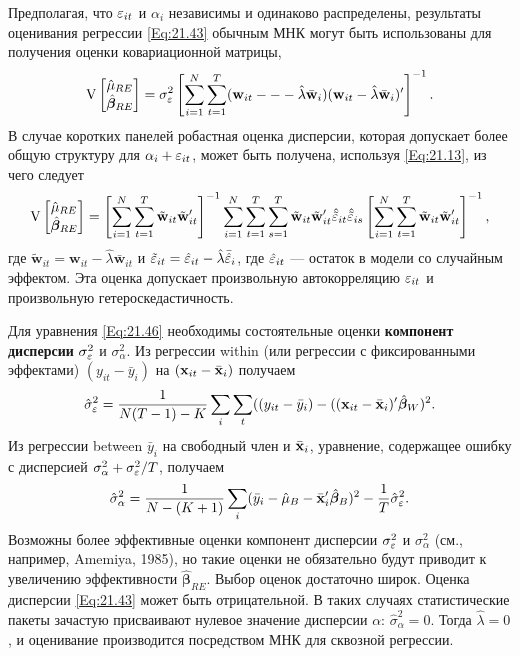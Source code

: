 Предполагая, что $\varepsilon_{it}$ и $\alpha_i$ независимы и одинаково распределены, результаты оценивания регрессии \ref{Eq:21.43} обычным МНК могут быть использованы для получения оценки ковариационной матрицы,
 \begin{align}
\mathrm V
\begin{bmatrix}
 \hat{\mu}_{RE} \\ \hat{\bm\beta}_{RE}
\end{bmatrix}
=
\sigma^2_\varepsilon
\left[ \sum^N_{i=1} \sum^T_{t=1} (\mathbf w_{it} --- \hat{\lambda} \bar{\mathbf w}_i)
 (\mathbf w_{it} -\hat{\lambda} \bar{\mathbf w}_i)' \right]^{-1}.
\label{Eq:21.46}
\end{align}
В случае коротких панелей робастная оценка дисперсии, которая допускает более общую структуру для $\alpha_i+\varepsilon_{it}$, может быть получена, используя \ref{Eq:21.13}, из чего следует
 \begin{align}
\mathrm V
\begin{bmatrix}
 \hat{\mu}_{RE} \\ \hat{\bm\beta}_{RE}
\end{bmatrix}
=
\left[ \sum^N_{i=1} \sum^T_{t=1} \tilde{\mathbf w}_{it} \tilde{\mathbf w}_{it}' \right]^{-1}
\sum^N_{i=1} \sum^T_{t=1} \sum^T_{s=1} \tilde{\mathbf w}_{it} \tilde{\mathbf w}_{it}' \hat{\tilde{\varepsilon}}_{it} \hat{\tilde{\varepsilon}}_{is}
\left[ \sum^N_{i=1} \sum^T_{t=1} \tilde{\mathbf w}_{it} \tilde{\mathbf w}_{it}' \right]^{-1},
\label{Eq:21.47}
\end{align}
где $\tilde{\mathbf w}_{it}=\mathbf w_{it} -\hat{\lambda} \bar{\mathbf w}_{it}$ и $\tilde{\varepsilon}_{it}=\hat{\varepsilon}_{it}-\hat{\lambda}\bar{\hat{\varepsilon}}_i$, где $\hat{\varepsilon}_{it}$ --- остаток в модели со случайным эффектом. Эта оценка допускает произвольную автокорреляцию $\varepsilon_{it}$ и произвольную гетероскедастичность.

Для уравнения \ref{Eq:21.46} необходимы состоятельные оценки \textbf{компонент дисперсии} $\sigma^2_\varepsilon$ и $\sigma^2_\alpha$. Из регрессии within (или регрессии с фиксированными эффектами) $(y_{it}-\bar{y}_i)$ на $(\mathbf{x}_{it}-\bar{\mathbf{x}}_i)$ получаем
 \begin{align}
\hat{\sigma}^2_\varepsilon=\frac{1}{N(T-1)-K}
\sum_i \sum_t ((y_{it}-\bar{y}_i)-((\mathbf{x}_{it}-\bar{\mathbf{x}}_i)'\hat{\bm\beta}_W)^2.
\label{Eq:21.48}
\end{align}
Из регрессии between $\bar{y}_i$ на свободный член и $\bar{\mathbf{x}}_i$, уравнение, содержащее ошибку с дисперсией $\sigma^2_\alpha+\sigma^2_\varepsilon/T$, получаем
 \begin{align}
\hat{\sigma}^2_\alpha=\frac{1}{N-(K+1)}
\sum_i  (\bar{y}_{i}-\hat{\mu}_B-\bar{\mathbf{x}}'_i\hat{\bm\beta}_B)^2-\frac{1}{T}\hat{\sigma}^2_\varepsilon.
\label{Eq:21.49}
\end{align}
Возможны более эффективные оценки компонент дисперсии $\sigma^2_\varepsilon$ и $\sigma^2_\alpha$ (см., например, Amemiya, 1985), но такие оценки не обязательно будут приводит к увеличению эффективности $\hat{\bm\beta}_{RE}$. Выбор оценок достаточно широк. Оценка дисперсии \ref{Eq:21.43} может быть отрицательной. В таких случаях статистические пакеты зачастую присваивают нулевое значение дисперсии $\alpha$: $\hat{\sigma}^2_{\alpha}=0$. Тогда $\hat{\lambda}=0$, и оценивание производится посредством МНК для сквозной регрессии.

